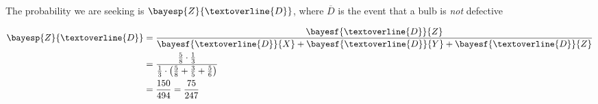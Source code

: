 \begin{solution}[\fullpage]
   The probability we are seeking is $\bayesp{Z}{\textoverline{D}}$, where $\overline{D}$ 
   is the event that a bulb is \textit{not} defective
   
   \begin{align}
      \bayesp{Z}{\textoverline{D}} &= \dfrac{\bayesf{\textoverline{D}}{Z}}
      {\bayesf{\textoverline{D}}{X} + \bayesf{\textoverline{D}}{Y} + \bayesf{\textoverline{D}}{Z}} \\
      &= \dfrac{\frac{5}{8}\cdot\frac{1}{3}}{\frac{1}{3}\cdot\left(\frac{5}{8} +
      \frac{3}{5} + \frac{5}{6}\right)} \\
      &= \dfrac{150}{494} = \dfrac{75}{247}
   \end{align}
   
\end{solution}
